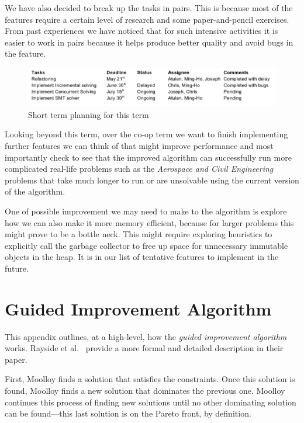 \documentclass[11pt]{article}
\theoremstyle{definition}
\begin{document}
We have also decided to break up the tasks in pairs. This is because most of the features require a certain level of research and some paper-and-pencil exercises. From past experiences we have noticed that for such intensive activities it is easier to work in pairs because it helps produce better quality and avoid bugs in the feature.

\begin{figure}[H]
	\caption{Short term planning for this term } \label{fig:shortterm}
	\includegraphics[width=\textwidth]{planning/shortterm}
\end{figure}

Looking beyond this term, over the co-op term we want to finish implementing further features we can think of that might improve performance and most importantly check to see that the improved algorithm can successfully run more complicated real-life problems such as the \emph{Aerospace and Civil Engineering} problems that take much longer to run or are unsolvable using the current version of the algorithm. 

One of possible improvement we may need to make to the algorithm is explore how we can also make it more memory efficient, because for larger problems this might prove to be a bottle neck. This might require exploring heuristics to explicitly call the garbage collector to free up space for unnecessary immutable objects in the heap. It is in our list of tentative features to implement in the future.

\pagebreak

\appendix

\section{Guided Improvement Algorithm}\label{app:impl}

This appendix outlines, at a high-level, how the \textit{guided
improvement algorithm} works. Rayside et al.~\cite{ref:Rayside09}
provide a more formal and detailed description in their paper.

First, Moolloy finds a solution that satisfies the constraints. Once
this solution is found, Moolloy finds a new solution that dominates the
previous one. Moolloy continues this process of finding new solutions
until no other dominating solution can be found---this last solution is
on the Pareto front, by definition.
\end{document}
